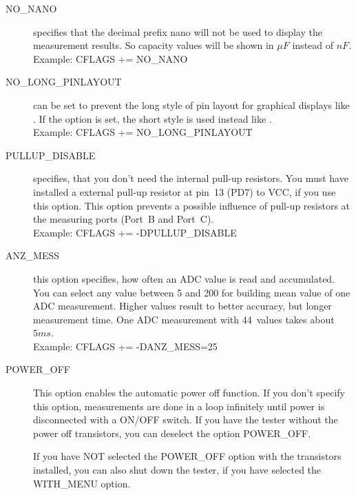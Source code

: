 \begin{description}
  \item[NO\_NANO] specifies that the decimal prefix nano will not be used to display the measurement results.
So capacity values will be shown in \(\mu F\) instead of \(nF\).\\
Example: CFLAGS += NO\_NANO

  \item[NO\_LONG\_PINLAYOUT] can be set to prevent the long style of pin layout for graphical displays 
like .
If the option is set, the short style is used instead like .\\
Example: CFLAGS += NO\_LONG\_PINLAYOUT

\item[PULLUP\_DISABLE] specifies, that you don't need the internal pull-up resistors.
 You must have installed a external pull-up resistor at pin~13 (PD7) to VCC, if you use this option.
This option prevents a possible influence of pull-up resistors at the measuring ports (Port~B and Port~C).\\
Example: CFLAGS += -DPULLUP\_DISABLE

  \item[ANZ\_MESS] this option specifies, how often an ADC value is read and accumulated.
You can select any value between 5 and 200 for building mean value of one ADC measurement.
Higher values result to better accuracy, but  longer measurement time.
One ADC measurement with 44~values takes about \(5ms\).\\
Example: CFLAGS += -DANZ\_MESS=25

  \item[POWER\_OFF] This option enables the automatic power off function. If you don't specify this option,
 measurements are done in a loop infinitely  until power is disconnected with a ON/OFF switch.
If you have the tester without the power off transistors, you can deselect the option POWER\_OFF.

If you have NOT selected the POWER\_OFF option with the transistors installed,
you can also shut down the tester, if you have selected the WITH\_MENU option.


\end{description}
